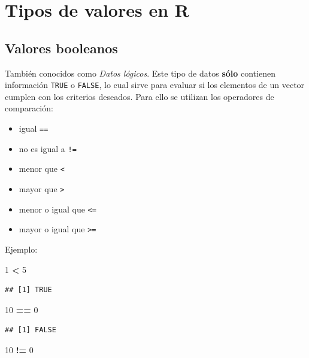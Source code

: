 \documentclass[
]{book}
\newenvironment{Shaded}{\begin{snugshade}}{\end{snugshade}}
\newcommand{\DecValTok}[1]{\textcolor[rgb]{0.00,0.00,0.81}{#1}}
\newcommand{\SpecialCharTok}[1]{\textcolor[rgb]{0.81,0.36,0.00}{\textbf{#1}}}
\providecommand{\tightlist}{%
  \setlength{\itemsep}{0pt}\setlength{\parskip}{0pt}}
\begin{document}
\hypertarget{tipos-de-valores-en-r}{%
\section{Tipos de valores en R}\label{tipos-de-valores-en-r}}

\hypertarget{valores-booleanos}{%
\subsection{Valores booleanos}\label{valores-booleanos}}

También conocidos como \emph{Datos lógicos}.
Este tipo de datos \textbf{sólo} contienen información \texttt{TRUE} o \texttt{FALSE}, lo cual sirve para evaluar si los elementos de un vector cumplen con los criterios deseados. Para ello se utilizan los operadores de comparación:

\begin{itemize}
\tightlist
\item
  igual \texttt{==}
\item
  no es igual a \texttt{!=}
\item
  menor que \texttt{\textless{}}
\item
  mayor que \texttt{\textgreater{}}
\item
  menor o igual que \texttt{\textless{}=}
\item
  mayor o igual que \texttt{\textgreater{}=}
\end{itemize}

Ejemplo:

\begin{Shaded}
\begin{Highlighting}[]
\DecValTok{1} \SpecialCharTok{\textless{}} \DecValTok{5}
\end{Highlighting}
\end{Shaded}

\begin{verbatim}
## [1] TRUE
\end{verbatim}

\begin{Shaded}
\begin{Highlighting}[]
\DecValTok{10} \SpecialCharTok{==} \DecValTok{0}    
\end{Highlighting}
\end{Shaded}

\begin{verbatim}
## [1] FALSE
\end{verbatim}

\begin{Shaded}
\begin{Highlighting}[]
\DecValTok{10} \SpecialCharTok{!=} \DecValTok{0}   
\end{Highlighting}
\end{Shaded}
\end{document}
